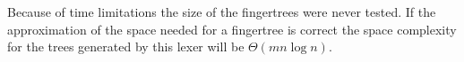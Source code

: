 Because of time limitations the size of the fingertrees were never tested. If
the approximation of the space needed for a fingertree is correct the space
complexity for the trees generated by this lexer will be $\Theta(mn\log n)$.

